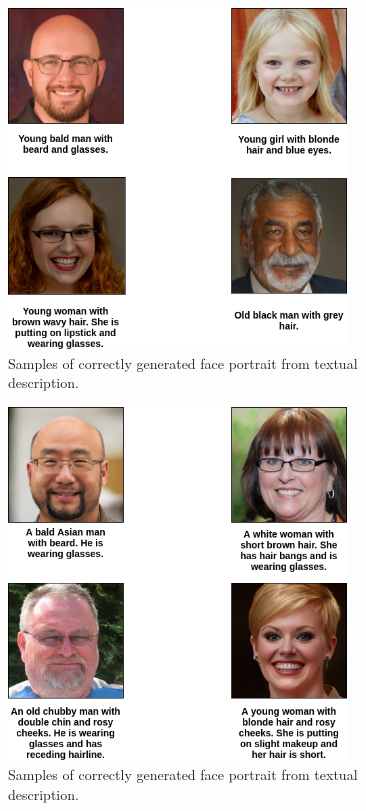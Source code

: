 \begin{figure}[H]
    \centering
    \includegraphics[width=0.8\textwidth]{images/correct-results_1.png}
    \caption{Samples of correctly generated face portrait from textual description.}
    \label{fig:correct_1}
\end{figure}

\begin{figure}[H]
    \centering
    \includegraphics[width=0.8\textwidth]{images/correct-results_2.png}
    \caption{Samples of correctly generated face portrait from textual description.}
    \label{fig:correct_2}
\end{figure}


